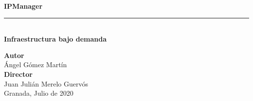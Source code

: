 \begin{titlepage}
 
 
\setlength{\centeroffset}{-0.5\oddsidemargin}
\addtolength{\centeroffset}{0.5\evensidemargin}
\thispagestyle{empty}

\noindent\hspace*{\centeroffset}\begin{minipage}{\textwidth}

\centering


\vspace{3.3cm}


{\Huge\bfseries IPManager}
\noindent\rule[-1ex]{\textwidth}{3pt}\\[3.5ex]
{\large\bfseries Infraestructura bajo demanda\\[4cm]}
\end{minipage}

\vspace{2.5cm}
\noindent\hspace*{\centeroffset}\begin{minipage}{\textwidth}
\centering

\textbf{Autor}\\ {Ángel Gómez Martín}\\[2.5ex]
\textbf{Director}\\
{Juan Julián Merelo Guervós}\\[2cm]
Granada, Julio de 2020
\end{minipage}

 
\end{titlepage}


